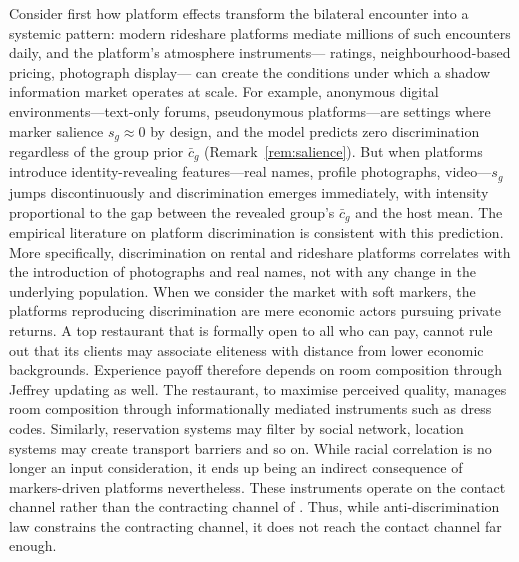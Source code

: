 \documentclass[pdflatex,sn-basic]{sn-jnl}
\theoremstyle{thmstyleone}
\numberwithin{proposition}{subsection}
\begin{document}
Consider first how platform effects transform the bilateral encounter into a systemic
pattern: modern rideshare platforms mediate millions of such
encounters daily, and the platform's atmosphere instruments---
ratings, neighbourhood-based pricing, photograph display--- can create
the conditions under which a shadow information market operates
at scale. For example, anonymous digital environments---text-only forums, pseudonymous
platforms---are settings where marker salience $s_g \approx 0$ by
design, and the
model predicts zero discrimination regardless of the group prior
$\bar{c}_g$
(Remark~\ref{rem:salience}). But when platforms introduce
identity-revealing features---real names, profile photographs,
video---$s_g$ jumps discontinuously and discrimination emerges
immediately, with intensity proportional to the gap between the
revealed group's $\bar{c}_g$ and the host mean. The empirical
literature on platform discrimination is consistent with this prediction. More specifically, discrimination on rental and rideshare platforms correlates with the introduction
of photographs and real names, not with any change in the underlying
population. When we consider the market with soft markers, the platforms reproducing discrimination are mere economic actors pursuing private returns. A top restaurant that is formally open to all who can pay, cannot rule out that its clients may associate eliteness with distance from lower economic backgrounds. Experience payoff therefore depends on room
composition through Jeffrey updating as well. The restaurant,
to maximise perceived quality, manages room composition through
informationally mediated instruments such as dress codes. Similarly, reservation systems may filter by social network, location systems may create transport barriers and so on. While racial correlation is no longer an input consideration, it ends up being an indirect consequence of markers-driven platforms nevertheless. These instruments operate on the contact channel rather than
the contracting channel of \citet{Loury2002}. Thus, while anti-discrimination law
constrains the contracting channel, it does not reach the
contact channel far enough.
\end{document}
